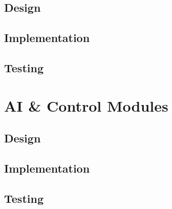 \subsection{Design}\label{soft/cv/design}

\subsection{Implementation}\label{soft/cv/impl}

\subsection{Testing}\label{soft/cv/test}



\section{AI \& Control Modules}\label{soft/ai}

\subsection{Design}\label{soft/ai/design}

\subsection{Implementation}\label{soft/ai/impl}

\subsection{Testing}\label{soft/ai/test}
